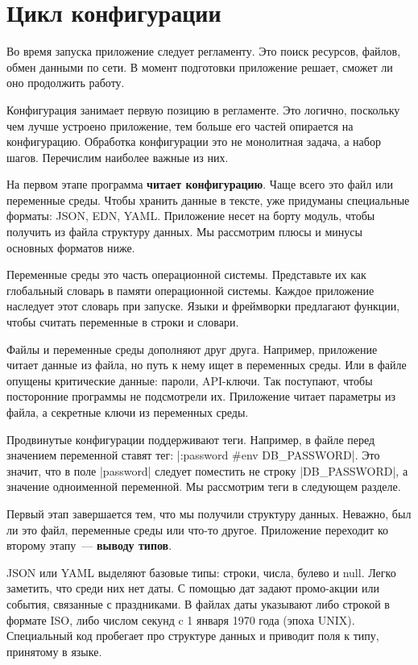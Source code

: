 \section{Цикл конфигурации}

Во время запуска приложение следует регламенту. Это поиск ресурсов, файлов,
обмен данными по сети. В момент подготовки приложение решает, сможет ли оно
продолжить работу.

Конфигурация занимает первую позицию в регламенте. Это логично, поскольку чем
лучше устроено приложение, тем больше его частей опирается на
конфигурацию. Обработка конфигурации это не монолитная задача, а набор
шагов. Перечислим наиболее важные из них.

На первом этапе программа \textbf{читает конфигурацию}. Чаще всего это файл или
переменные среды. Чтобы хранить данные в тексте, уже придуманы специальные
форматы: JSON, EDN, YAML. Приложение несет на борту модуль, чтобы получить из
файла структуру данных. Мы рассмотрим плюсы и минусы основных форматов ниже.

Переменные среды это часть операционной системы. Представьте их как глобальный
словарь в памяти операционной системы. Каждое приложение наследует этот словарь
при запуске. Языки и фреймворки предлагают функции, чтобы считать переменные в
строки и словари.

Файлы и переменные среды дополняют друг друга. Например, приложение читает
данные из файла, но путь к нему ищет в переменных среды. Или в файле опущены
критические данные: пароли, API-ключи. Так поступают, чтобы посторонние
программы не подсмотрели их. Приложение читает параметры из файла, а секретные
ключи из переменных среды.

Продвинутые конфигурации поддерживают теги. Например, в файле перед значением
переменной ставят тег: \spverb|:password #env DB_PASSWORD|. Это значит, что в
поле \spverb|password| следует поместить не строку \spverb|DB_PASSWORD|, а
значение одноименной переменной. Мы рассмотрим теги в следующем разделе.

Первый этап завершается тем, что мы получили структуру данных. Неважно, был ли
это файл, переменные среды или что-то другое. Приложение переходит ко второму
этапу~--- \textbf{выводу типов}.

JSON или YAML выделяют базовые типы: строки, числа, булево и null. Легко
заметить, что среди них нет даты. С помощью дат задают промо-акции или события,
связанные с праздниками. В файлах даты указывают либо строкой в формате ISO,
либо числом секунд c 1 января 1970 года (эпоха UNIX). Специальный код пробегает
про структуре данных и приводит поля к типу, принятому в языке.

